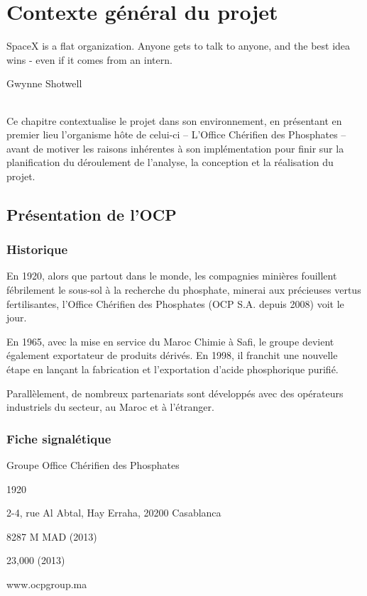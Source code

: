 \chapter{Contexte général du projet}
\epigraph{SpaceX is a flat organization. Anyone gets to talk to anyone, and the best idea wins - even if it comes from an intern.}{Gwynne Shotwell}	
\subparagraph{}
Ce chapitre contextualise le projet dans son environnement, en présentant en premier lieu l'organisme hôte de celui-ci – L'Office Chérifien des Phosphates – avant de motiver les raisons inhérentes à son implémentation pour finir sur la planification du déroulement de l'analyse, la conception et la réalisation du projet.
\cleardoublepage

\section{Présentation de l’OCP}
	\subsection{Historique}
	En 1920, alors que partout dans le monde, les compagnies minières fouillent fébrilement le
sous-sol à la recherche du phosphate, minerai aux précieuses vertus fertilisantes, l’Office
Chérifien des Phosphates (OCP S.A. depuis 2008) voit le jour.

En 1965, avec la mise en service du Maroc Chimie à Safi, le groupe devient également
exportateur de produits dérivés. En 1998, il franchit une nouvelle étape en lançant la fabrication
et l’exportation d’acide phosphorique purifié.

Parallèlement, de nombreux partenariats sont développés avec des opérateurs industriels du
secteur, au Maroc et à l’étranger.
	\subsection{Fiche signalétique}
	\begin{description}[align=left]
		\item [Nomination sociale :] Groupe Office Chérifien des Phosphates
		\item [Date de création :] 1920
		\item [Siège social :] 2-4, rue Al Abtal, Hay Erraha, 20200 Casablanca
		\item [Capital social :] 8287 M MAD (2013)
		\item [Effectif employé :] 23,000 (2013)
		\item [Site web :] www.ocpgroup.ma
	\end{description}

